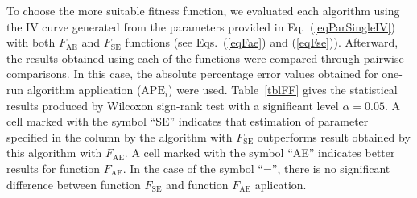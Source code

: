 \documentclass[a4paper,fleqn]{cas-dc}
\begin{document}
To choose the more suitable fitness function, we evaluated each algorithm using the IV curve generated from the parameters
provided in Eq.~(\ref{eqParSingleIV}) with both $F_\mathrm{AE}$ and $F_\mathrm{SE}$ functions (see Eqs.~(\ref{eqFae}) and (\ref{eqFse})).
Afterward, the results obtained using each of the functions were compared through pairwise comparisons.
In this case, the absolute percentage error values obtained for one-run algorithm application ($\mathrm{APE}_i$) were used.
Table~\ref{tblFF} gives the statistical results produced by Wilcoxon sign-rank test with a significant level $\alpha = 0.05$.
A cell marked with the symbol ``SE'' indicates that estimation of parameter specified in the column by the algorithm with $F_\mathrm{SE}$ outperforms result obtained by this  algorithm with $F_\mathrm{AE}$.
A cell marked with the symbol ``AE'' indicates better results for function $F_\mathrm{AE}$.
In the case of the symbol ``='', there is no significant difference between function $F_\mathrm{SE}$ and function $F_\mathrm{AE}$ aplication.


\end{document}
